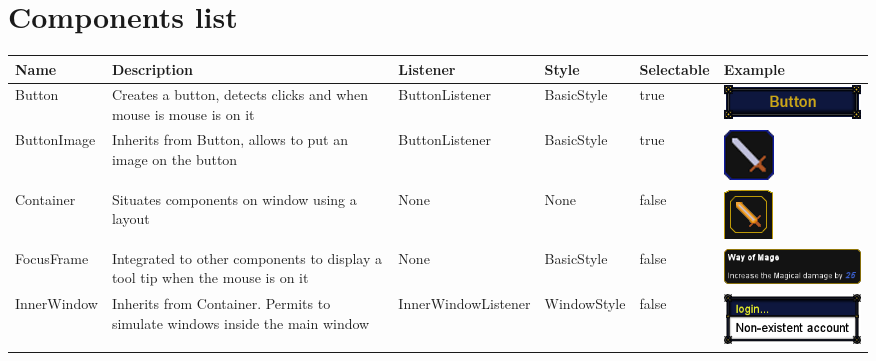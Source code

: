 \documentclass{scrreprt}
\begin{document}
					\chapter{Components list}
					\addtolength{\oddsidemargin}{-.875in}
					\addtolength{\evensidemargin}{-.875in}
					\small
\begin{center}
\begin{tabular}{|p{2.2cm}|p{4cm}|p{3.5cm}|p{2cm}|p{1.5cm}|p{4cm}|}
\hline
Name & Description & Listener & Style & Selectable & Example \\
\hline
Button & Creates a button, detects clicks and when mouse is mouse is on it & ButtonListener & BasicStyle & true & \includegraphics[scale=0.5]{button.png} \\
\hline
ButtonImage & Inherits from Button, allows to put an image on the button & ButtonListener & BasicStyle & true & \includegraphics[scale=0.5]{buttonimage.png} \\
\hline
Container & Situates components on window using a layout & None & None & false & \includegraphics[scale=0.5]{Container.png} \\
\hline
FocusFrame & Integrated to other components to display a tool tip when the mouse is on it & None & BasicStyle & false & \includegraphics[scale=0.5]{focusframe.png} \\
\hline
InnerWindow & Inherits from Container. Permits to simulate windows inside the main window & InnerWindowListener & WindowStyle & false & \includegraphics[scale=0.5]{Innerwindow.png} \\

\end{tabular}
\end{center}
\end{document}
